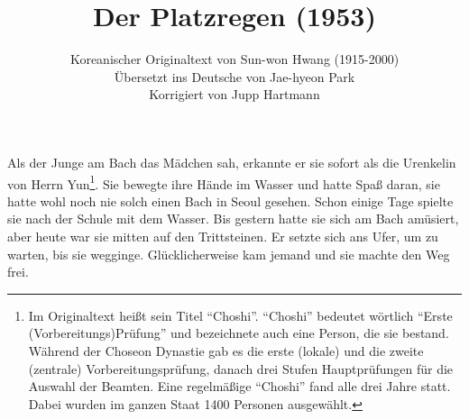 \documentclass[prd,12pt,tightenlines,notitlepage,nofootinbib]{revtex4-1}
\begin{document}
\title{Der Platzregen (1953)}
\author{Koreanischer Originaltext von Sun-won Hwang (1915-2000)
\\ Übersetzt ins Deutsche von Jae-hyeon Park
\\ Korrigiert von Jupp Hartmann}
\maketitle

\noindent
Als der Junge am Bach das Mädchen sah, erkannte er sie sofort als die
Urenkelin von Herrn Yun\footnote{Im Originaltext heißt sein Titel "`Choshi"'.
"`Choshi"' bedeutet wörtlich "`Erste (Vorbereitungs)Prüfung"' und
bezeichnete auch eine Person, die sie bestand.
Während der Choseon Dynastie gab es
die erste (lokale) und die zweite (zentrale) Vorbereitungsprüfung,
danach drei Stufen Hauptprüfungen für die Auswahl der Beamten.
Eine regelmäßige "`Choshi"' fand alle drei Jahre statt. Dabei wurden
im ganzen Staat 1400 Personen ausgewählt.}.
Sie bewegte ihre Hände im Wasser und hatte
Spaß daran, sie hatte wohl noch nie solch einen Bach in Seoul gesehen.
Schon einige Tage spielte sie nach der Schule mit dem Wasser.
Bis gestern hatte sie sich am Bach amüsiert,
aber heute war sie mitten auf den Trittsteinen.  Er
setzte sich ans Ufer, um zu warten, bis sie wegginge.  Glücklicherweise kam
jemand und sie machte den Weg frei.
\end{document}
